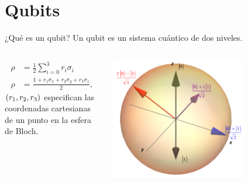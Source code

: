 \documentclass[xcolor=dvipsnames,presentation]{beamer}%
\begin{document}

\section{Qubits}

\begin{frame}{¿Qué es un qubit?}
	Un qubit es un sistema cuántico de dos niveles.
	
	\begin{columns}
	\hspace{1cm}
	\begin{column}{0.7\textwidth}
		\begin{align*}
			\rho &= \frac{1}{2}\sum _{i=0}^3 r_i\sigma_i \\
			\rho &= \frac{\mathds{1}+r_1\sigma_x+r_2\sigma_y+r_3\sigma_z}{2},
		\end{align*}	
		$\qty(r_1,r_2,r_3)$ especifican las coordenadas cartesianas de un 
 		punto en la esfera de Bloch.
	\end{column}\hspace{-1cm}
	\begin{column}{0.5\textwidth}  
  		\begin{center}
    		\includegraphics[width=0.7\textwidth]{bloch-sph}      
     \end{center}
		\end{column}
	\end{columns}
\end{frame}
\end{document}
